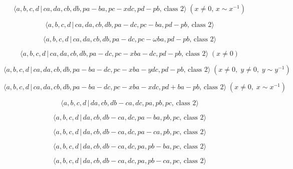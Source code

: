 \documentclass[10pt]{article}
\begin{document}
\begin{equation}
\langle a,b,c,d\,|\,ca,da,cb,db,pa-ba,pc-xdc,pd-pb,\,\text{class }2\rangle
\;(x\neq 0,\,x\sim x^{-1})  \tag{7.3025}
\end{equation}

\begin{equation}
\langle a,b,c,d\,|\,ca,da,cb,db,pa-dc,pc-ba,pd-pb,\,\text{class }2\rangle 
\tag{7.3026}
\end{equation}

\begin{equation}
\langle a,b,c,d\,|\,ca,da,cb,db,pa-dc,pc-\omega ba,pd-pb,\,\text{class }%
2\rangle  \tag{7.3027}
\end{equation}

\begin{equation}
\langle a,b,c,d\,|\,ca,da,cb,db,pa-dc,pc-xba-dc,pd-pb,\,\text{class }%
2\rangle \;(x \neq 0)  \tag{7.3028}
\end{equation}

\begin{equation}
\langle a,b,c,d\,|\,ca,da,cb,db,pa-ba-dc,pc-xba-ydc,pd-pb,\,\text{class }%
2\rangle \;(x\neq 0,\;y\neq 0,\;y\sim y^{-1})  \tag{7.3029}
\end{equation}

\begin{equation}
\langle a,b,c,d\,|\,ca,da,cb,db,pa-ba-dc,pc-xba-xdc,pd+ba-pb,\,\text{class }%
2\rangle \;(x\neq 0,\;x\sim x^{-1})  \tag{7.3030}
\end{equation}

\begin{equation}
\langle a,b,c,d\,|\,da,cb,db-ca,dc,pa,pb,pc,\,\text{class }2\rangle 
\tag{7.3031}
\end{equation}

\begin{equation}
\langle a,b,c,d\,|\,da,cb,db-ca,dc,pa-ba,pb,pc,\,\text{class }2\rangle 
\tag{7.3032}
\end{equation}

\begin{equation}
\langle a,b,c,d\,|\,da,cb,db-ca,dc,pa-ca,pb,pc,\,\text{class }2\rangle 
\tag{7.3033}
\end{equation}

\begin{equation}
\langle a,b,c,d\,|\,da,cb,db-ca,dc,pa,pb-ba,pc,\,\text{class }2\rangle 
\tag{7.3034}
\end{equation}

\begin{equation}
\langle a,b,c,d\,|\,da,cb,db-ca,dc,pa,pb-ca,pc,\,\text{class }2\rangle 
\tag{7.3035}
\end{equation}
\end{document}
